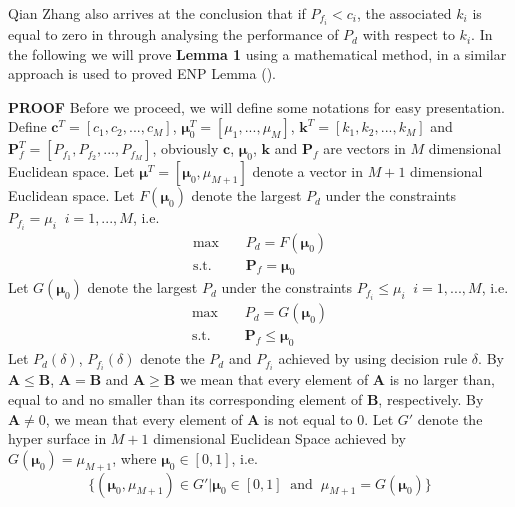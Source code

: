 Qian Zhang also arrives at the conclusion that if $P_{f_i} < c_i$, the associated $k_i$ is equal to zero in \cite{zhang1999design, zhang2000efficient} through analysing the performance of $P_d$ with respect to $k_i$. In the following we will prove \textbf{Lemma 1} using a mathematical method, in \cite{LehmannTest, dantzig1951fundamental} a similar approach is used to proved ENP Lemma ().

\noindent\textbf{PROOF}
\newcommand{\bmu}{\boldsymbol{\mu}}
Before we proceed, we will define some notations for easy presentation.
Define $\mathbf{c}^T = [c_1, c_2, ..., c_M]$, $\boldsymbol{\mu}_0^T = [\mu_1, ..., \mu_M]$, $\mathbf{k}^T = [k_1, k_2, ..., k_M]$ and  $\mathbf{P}_f^T = [P_{f_1}, P_{f_2}, ..., P_{f_M}]$, obviously $\mathbf{c}$, $\bmu_0$, $\mathbf{k}$ and $\mathbf{P}_f$ are vectors in $M$ dimensional Euclidean  space. Let $\bmu^T = [\bmu_0, \mu_{M+1}]$ denote a vector in $M+1$ dimensional Euclidean space. 
Let $F(\boldsymbol{\mu}_0)$ denote the largest $P_d$ under the constraints $P_{f_i} = \mu_i\;\;i = 1, ..., M$, i.e.
\begin{equation}
\label{def: F}
\begin{split}
\max&\;\;\;\;P_d = F(\bmu_0)\\
\text{s.t.}&\;\;\;\;\mathbf{P}_f = \bmu_0
\end{split}
\end{equation}
Let $G(\boldsymbol{\mu}_0)$ denote the largest $P_d$ under the constraints $P_{f_i} \leq \mu_i\;\;i = 1, ..., M$, i.e.
\begin{equation}
\begin{split}
\label{def: function G}
\max&\;\;\;\;P_d = G(\bmu_0)\\
\text{s.t.}&\;\;\;\;\mathbf{P}_f \leq \bmu_0
\end{split}
\end{equation}
Let $P_d(\delta)$, $P_{f_i}(\delta)$ denote the $P_d$ and $P_{f_i}$ achieved by using decision rule $\delta$.
By $\mathbf{A} \leq \mathbf{B}$, $\mathbf{A} = \mathbf{B}$ and  $\mathbf{A} \geq \mathbf{B}$ we mean that every element of $\mathbf{A}$ is no larger than, equal to and no smaller than its corresponding element of $\mathbf{B}$, respectively. 
By $\mathbf{A} \neq 0$, we mean that every element of $\mathbf{A}$ is not equal to $0$. 
Let $G'$ denote the hyper surface in $M+1$ dimensional Euclidean Space achieved by $G(\bmu_0) = \mu_{M+1}$, where $\bmu_0 \in [0, 1]$, i.e.
\begin{equation}
\label{def: G'}
\{(\bmu_0, \mu_{M+1}) \in G' | \bmu_0 \in [0, 1] \;\;\text{and}\;\;\mu_{M+1} = G(\bmu_0) \}
\end{equation}
